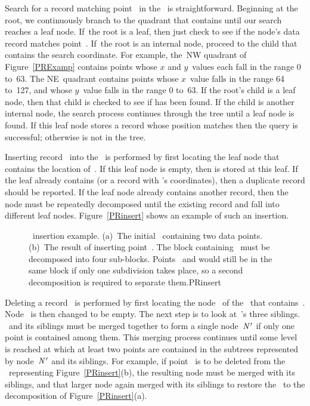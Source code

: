Search for a record matching point~ in the \PRquad\ is
straightforward.
Beginning at the root, we continuously branch to the quadrant that
contains  until our search reaches a leaf node.
If~the root is a leaf, then just check to see if the node's data
record matches point~.
If~the root is an internal node, proceed to the child that contains
the search coordinate.
For example, the~NW quadrant of Figure~\ref{PRExamp} contains points
whose $x$ and $y$~values each fall in the range 0 to~63.
The NE~quadrant contains points whose $x$~value falls in the range 64
to~127, and whose $y$~value falls in the range 0 to~63.
If the root's child is a leaf node, then that child is checked to see
if  has been found.
If the child is another internal node, the search process continues
through the tree until a leaf node is found.
If this leaf node stores a record whose position matches  then
the query is successful; otherwise  is not in the tree.

Inserting record~ into the \PRquad\ is performed by first
locating the leaf node that contains the location of~.
If this leaf node is empty, then  is stored at this
leaf.
If the leaf already contains  (or a record with 's
coordinates), then a duplicate record should be reported.
If the leaf node already contains another record, then the node
must be repeatedly decomposed until the existing record and 
fall into different leaf nodes.
Figure~\ref{PRinsert} shows an example of such an insertion.

\begin{figure}
\vspace{-\smallskipamount}

{\PRquad\ insertion example.
(a)~The initial \PRquad\ containing two data points.
(b)~The result of inserting point~.
The block containing~ must be decomposed into four sub-blocks.
Points~ and  would still be in the same block if only
one subdivision takes place, so a second decomposition is required to
separate them.}{PRinsert}
\bigskip
\end{figure}

Deleting a record~ is performed by first locating the
node~ of the \PRquad\ that contains~. 
Node~ is then changed to be empty.
The next step is to look at~'s three siblings.
~and its siblings must be merged together to form a single
node~${\textit{N}}\,'$ if only one point is contained among them.
This merging process continues until some level is reached at which
at least two points are contained in the subtrees represented by
node~${\textit{N}}\,'$ and its siblings.
For example, if point~ is to be deleted from the \PRquad\
representing Figure~\ref{PRinsert}(b), the resulting node must be
merged with its siblings, and that larger node again merged with its
siblings to restore the \PRquad\ to the decomposition of
Figure~\ref{PRinsert}(a).

